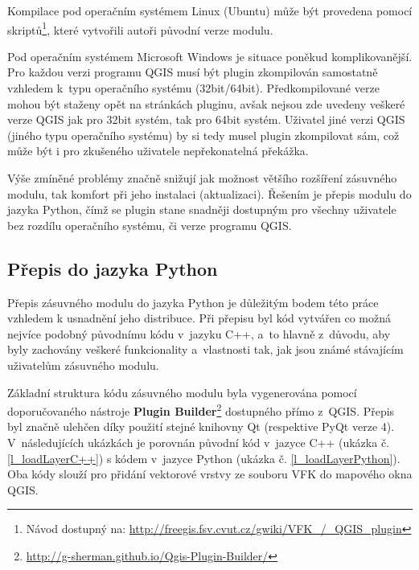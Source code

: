 \documentclass[a4paper,12pt,oneside]{book}
\begin{document}
Kompilace pod operačním systémem Linux (Ubuntu) může být provedena
pomocí skriptů\footnote{Návod dostupný na:
  \url{http://freegis.fsv.cvut.cz/gwiki/VFK\_/\_QGIS\_plugin}}, které
vytvořili autoři původní verze modulu.

Pod operačním systémem Microsoft Windows je situace poněkud
komplikovanější. Pro každou verzi programu QGIS musí být plugin
zkompilován samostatně vzhledem k~typu operačního systému
(32bit/64bit). Předkompilované verze mohou být staženy opět na
stránkách pluginu, avšak nejsou zde uvedeny veškeré verze QGIS jak pro
32bit systém, tak pro 64bit systém. Uživatel jiné verzi QGIS (jiného
typu operačního systému) by si tedy musel plugin zkompilovat sám, což
může být i pro zkušeného uživatele nepřekonatelná překážka.

Výše zmíněné problémy značně snižují jak možnost většího rozšíření
zásuvného modulu, tak komfort při jeho instalaci
(aktualizaci). Řešením je přepis modulu do jazyka Python, čímž se
plugin stane snadněji dostupným pro všechny uživatele bez rozdílu
operačního systému, či verze programu QGIS.

\subsection{Přepis do jazyka Python}

Přepis zásuvného modulu do jazyka Python je důležitým bodem této
práce vzhledem k usnadnění jeho distribuce. Při přepisu byl kód vytvářen 
co možná nejvíce podobný původnímu kódu v~jazyku C++, a~to hlavně z~důvodu, 
aby byly zachovány veškeré funkcionality a~vlastnosti tak, jak jsou známé
stávajícím uživatelům zásuvného modulu.

Základní struktura kódu zásuvného modulu byla vygenerována pomocí
doporučovaného nástroje \textbf{Plugin
Builder}\footnote{\url{http://g-sherman.github.io/Qgis-Plugin-Builder/}}
dostupného přímo z~QGIS. Přepis byl značně ulehčen díky použití stejné
knihovny Qt (respektive PyQt verze 4). V~následujících ukázkách je
porovnán původní kód v~jazyce C++ (ukázka č. \ref{l_loadLayerC++})
s kódem v~jazyce Python (ukázka
č. \ref{l_loadLayerPython}). Oba kódy slouží pro přidání vektorové
vrstvy ze souboru VFK do mapového okna QGIS.
\end{document}
